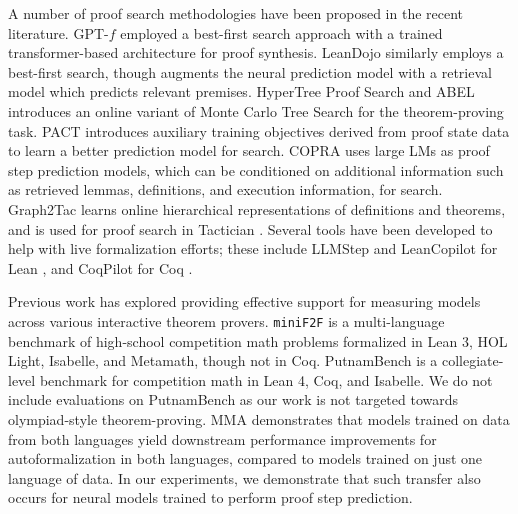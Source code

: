 A number of proof search methodologies have been proposed in the recent literature. GPT-$f$ \citep{polu2020generative} employed a best-first search approach with a trained transformer-based architecture for proof synthesis. LeanDojo \citep{yang2023leandojo} similarly employs a best-first search, though augments the neural prediction model with a retrieval model which predicts relevant premises. HyperTree Proof Search and ABEL \citep{lample2022hypertree, gloeckle2024abel} introduces an online variant of Monte Carlo Tree Search for the theorem-proving task. PACT \citep{han2021proof} introduces auxiliary training objectives derived from proof state data to learn a better prediction model for search. COPRA \citep{thakur2024incontext} uses large LMs as proof step prediction models, which can be conditioned on additional information such as retrieved lemmas, definitions, and execution information, for search. Graph2Tac \citep{blaauwbroek2024graph2taconlinerepresentationlearning} learns online hierarchical representations of definitions and theorems, and is used for proof search in Tactician \citep{Blaauwbroek_2020}. Several tools have been developed to help with live formalization efforts; these include LLMStep and LeanCopilot for Lean \citep{welleck2023llmstepllmproofstepsuggestions, song2024largelanguagemodelscopilots}, and CoqPilot for Coq \citep{coqpilot}.

Previous work has explored providing effective support for measuring models across various interactive theorem provers. \texttt{miniF2F} \citep{zheng2021minif2f} is a multi-language benchmark of high-school competition math problems formalized in Lean 3, HOL Light, Isabelle, and Metamath, though not in Coq. PutnamBench \citep{tsoukalas2024putnambenchevaluatingneuraltheoremprovers} is a collegiate-level benchmark for competition math in Lean 4, Coq, and Isabelle. We do not include evaluations on PutnamBench as our work is not targeted towards olympiad-style theorem-proving. MMA \citep{jiang2023multilingualmathematicalautoformalization} demonstrates that models trained on data from both languages yield downstream performance improvements for autoformalization in both languages, compared to models trained on just one language of data. In our experiments, we demonstrate that such transfer also occurs for neural models trained to perform proof step prediction.
